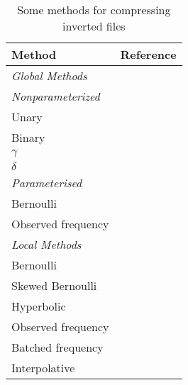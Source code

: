 \begin{table}[t]
\begin{center}
\begin{tabular}{ll}
Method & Reference \\
\hline
\emph{Global Methods} \\
\hspace{5mm} \emph{Nonparameterized} \\
\hspace{10mm} Unary \\
\hspace{10mm} Binary \\
\hspace{10mm} $\gamma$  & \cite{elias75universal,bentley76} \\
\hspace{10mm} $\delta$ & \cite{elias75universal,bentley76} \\

\hspace{5mm} \emph{Parameterised} \\
\hspace{10mm} Bernoulli & \cite{gallager75optimal,golomb66} \\
\hspace{10mm} Observed frequency \\

\hline

\emph{Local Methods} \\
\hspace{5mm} Bernoulli & \cite{witten91indexing,bookstein92model} \\
\hspace{5mm} Skewed Bernoulli & \cite{teuhola78,moffat92param} \\
\hspace{5mm} Hyperbolic &  \cite{schuegraf76} \\
\hspace{5mm} Observed frequency  \\
\hspace{5mm} Batched frequency & \cite{moffat92param}\\
\hspace{5mm} Interpolative   \\

\end{tabular}
\caption{Some methods for compressing inverted files}
\label{models}
\end{center}
\end{table}

